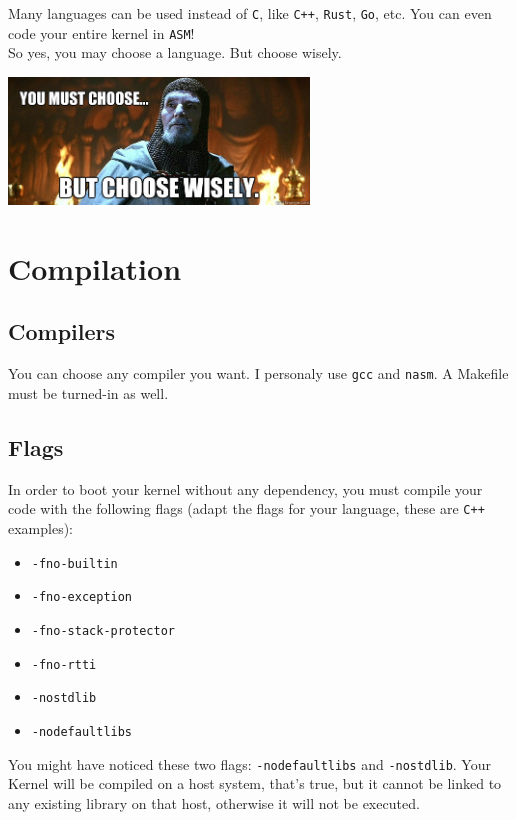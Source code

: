 \documentclass{42-en}
\begin{document}
            Many languages can be used instead of \texttt{C},
            like \texttt{C++}, \texttt{Rust}, \texttt{Go}, etc.
            You can even code your entire kernel in \texttt{ASM}!\\
            So yes, you may choose a language. But choose wisely.
            \begin{center}
              \includegraphics[width=8cm]{choose.jpg}
            \end{center}
\newpage

    \section{Compilation}
        \subsection{Compilers}
            You can choose any compiler you want. I personaly use \texttt{gcc}
            and \texttt{nasm}. A Makefile must be turned-in as well.
        \subsection{Flags}
            In order to boot your kernel without any dependency, you must
            compile your code with the following flags (adapt the flags for
            your language, these are \texttt{C++} examples):
            \begin{itemize}\itemsep1pt
                \item \texttt{-fno-builtin}
                \item \texttt{-fno-exception}
                \item \texttt{-fno-stack-protector}
                \item \texttt{-fno-rtti}
                \item \texttt{-nostdlib}
                \item \texttt{-nodefaultlibs}
            \end{itemize}
            You might have noticed these two flags: \texttt{-nodefaultlibs}
            and \texttt{-nostdlib}. Your Kernel will be compiled on a host
            system, that's true, but it cannot be linked to any existing
            library on that host, otherwise it will not be executed.
\end{document}
